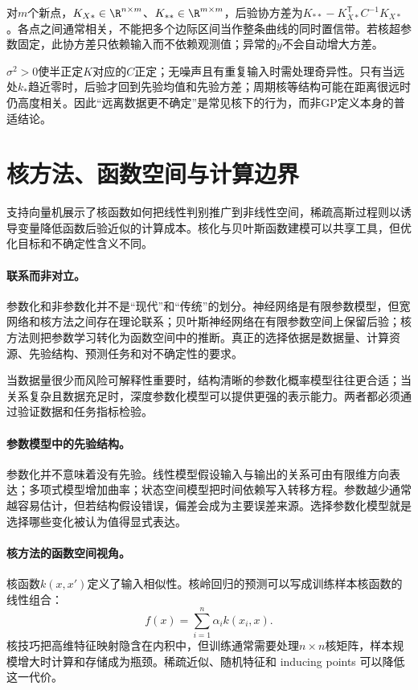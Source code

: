 对$m$个新点，$K_{X*}\in\R^{n\times m}$、$K_{**}\in\R^{m\times m}$，后验协方差为$K_{**}-K_{X*}^{\mathsf T}C^{-1}K_{X*}$。各点之间通常相关，不能把多个边际区间当作整条曲线的同时置信带。若核超参数固定，此协方差只依赖输入而不依赖观测值；异常的$y$不会自动增大方差。

$\sigma^2>0$使半正定$K$对应的$C$正定；无噪声且有重复输入时需处理奇异性。只有当远处$k_*$趋近零时，后验才回到先验均值和先验方差；周期核等结构可能在距离很远时仍高度相关。因此“远离数据更不确定”是常见核下的行为，而非GP定义本身的普适结论。

\section{核方法、函数空间与计算边界}
支持向量机展示了核函数如何把线性判别推广到非线性空间，稀疏高斯过程则以诱导变量降低函数后验近似的计算成本\cite{cortes1995svm,titsias2009sparsegp}。核化与贝叶斯函数建模可以共享工具，但优化目标和不确定性含义不同。
\paragraph{联系而非对立。}
参数化和非参数化并不是“现代”和“传统”的划分。神经网络是有限参数模型，但宽网络和核方法之间存在理论联系；贝叶斯神经网络在有限参数空间上保留后验；核方法则把参数学习转化为函数空间中的推断。真正的选择依据是数据量、计算资源、先验结构、预测任务和对不确定性的要求。

\begin{remark}
 当数据量很少而风险可解释性重要时，结构清晰的参数化概率模型往往更合适；当关系复杂且数据充足时，深度参数化模型可以提供更强的表示能力。两者都必须通过验证数据和任务指标检验。
\end{remark}

\paragraph{参数模型中的先验结构。}
参数化并不意味着没有先验。线性模型假设输入与输出的关系可由有限维方向表达；多项式模型增加曲率；状态空间模型把时间依赖写入转移方程。参数越少通常越容易估计，但若结构假设错误，偏差会成为主要误差来源。选择参数化模型就是选择哪些变化被认为值得显式表达。

\paragraph{核方法的函数空间视角。}
核函数$k(x,x')$定义了输入相似性。核岭回归的预测可以写成训练样本核函数的线性组合：
\begin{equation}
 f(x)=\sum_{i=1}^{n}\alpha_i k(x_i,x).
\end{equation}
核技巧把高维特征映射隐含在内积中，但训练通常需要处理$n\times n$核矩阵，样本规模增大时计算和存储成为瓶颈。稀疏近似、随机特征和 inducing points 可以降低这一代价。


